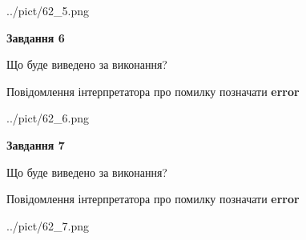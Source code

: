 \documentclass[10pt, ukrainian]{article}
\begin{document}
{\begin {large}
\begin{center}
	{../pict/62_5.png}
\end{center}
\newpage

{\begin {center}\textbf{Завдання 6}\end {center}}\par
Що буде виведено за виконання? \par
Повідомлення інтерпретатора про помилку позначати \textbf{error}

\begin{center}
	{../pict/62_6.png}
\end{center}
\newpage

{\begin {center}\textbf{Завдання 7}\end {center}}\par
Що буде виведено за виконання? \par
Повідомлення інтерпретатора про помилку позначати \textbf{error}

\begin{center}
	{../pict/62_7.png}
\end{center}
\newpage

\end {large}}
\end{document}

